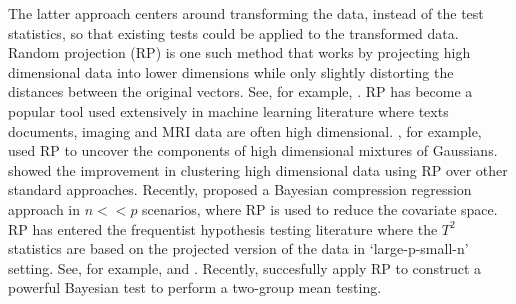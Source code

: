 \documentclass[]{article}
\begin{document}
The latter approach centers around transforming the data, instead of the test statistics, so that existing tests could be applied to the transformed data.
Random projection (RP) is one such method that works by projecting high dimensional data into lower dimensions while only slightly distorting the distances between the original vectors. See, for example, \citet{dasgupta2003elementary}.
RP has become a popular tool used extensively in machine learning literature where texts documents, imaging and MRI data are often high dimensional.
\citet{dasgupta2000experiments}, for example, used RP to uncover the components of high dimensional mixtures of Gaussians.
\citet{fern2003random} showed the improvement in clustering high dimensional data using RP over other standard approaches.
Recently, \citet{guhaniyogi2013} proposed a Bayesian compression regression approach in $n << p$ scenarios, where RP is used to reduce the covariate space.
RP has entered the frequentist hypothesis testing literature where the $T^{2}$ statistics are based on the projected version of the data in `large-p-small-n' setting. See, for example, \cite{lopes2011more} and \cite{srivastava2014raptt}. Recently, \cite{zoh2018powerful} succesfully apply RP to construct a powerful Bayesian test to perform a two-group mean testing. 
\end{document}
